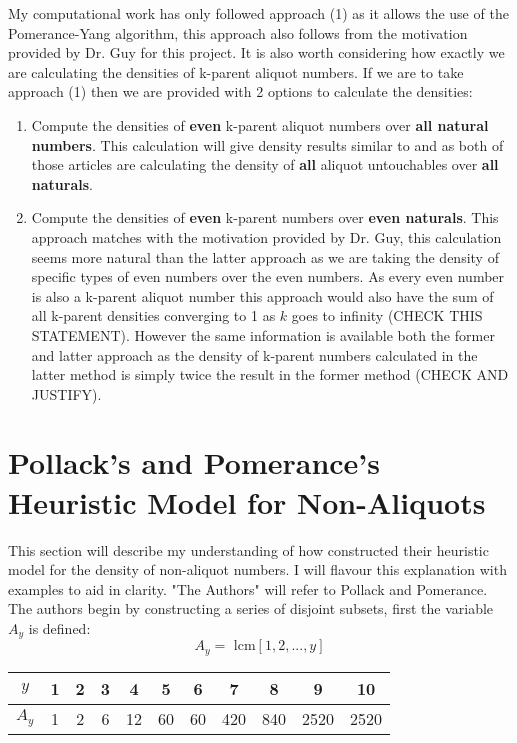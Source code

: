 \documentclass[12pt]{amsart}
\theoremstyle{definition}
\numberwithin{equation}{section}
\begin{document}
My computational work has only followed approach (1) as it allows the use of the Pomerance-Yang algorithm, this approach also follows from the motivation provided by Dr. Guy for this project. It is also worth considering how exactly we are calculating the densities of k-parent aliquot numbers. If we are to take approach (1) then we are provided with 2 options to calculate the densities: \begin{enumerate}
    \item Compute the densities of \textbf{even} k-parent aliquot numbers over \textbf{all natural numbers}. This calculation will give density results similar to \cite{chum} and \cite{pomYang} as both of those articles are calculating the density of \textbf{all} aliquot untouchables over \textbf{all naturals}. 
    \item Compute the densities of \textbf{even} k-parent numbers over \textbf{even naturals}. This approach matches with the motivation provided by Dr. Guy, this calculation seems more natural than the latter approach as we are taking the density of specific types of even numbers over the even numbers. As every even number is also a k-parent aliquot number this approach would also have the sum of all k-parent densities converging to 1 as $k$ goes to infinity (CHECK THIS STATEMENT). However the same information is available both the former and latter approach as the density of k-parent numbers calculated in the latter method is simply twice the result in the former method (CHECK AND JUSTIFY).
\end{enumerate} 

\section{Pollack's and Pomerance's Heuristic Model for Non-Aliquots}
This section will describe my understanding of how \cite{pollPom} constructed their heuristic model for the density of non-aliquot numbers. I will flavour this explanation with examples to aid in clarity. "The Authors" will refer to Pollack and Pomerance.
\\

The authors begin by constructing a series of disjoint subsets, first the variable $A_y$ is defined:
$$A_y = \text{ lcm}[1, 2, ..., y]$$

\begin{center}
\begin{tabular}{ |c|c|c|c|c|c|c|c|c|c|c|} 
 \hline
 $y$ & 1 & 2  & 3 & 4  & 5 & 6 & 7 & 8 & 9 &10 \\ 
 \hline
 $A_y$ & 1 & 2 & 6 & 12  & 60 & 60 & 420 & 840 & 2520 & 2520\\ 

 \hline
\end{tabular}

\end{center}
\end{document}
